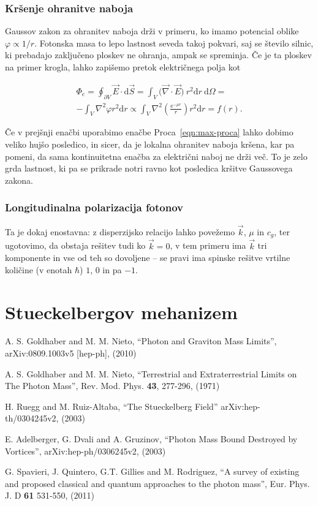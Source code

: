 \documentclass[a4paper, twocolumn, titlepage]{article}
\renewcommand{\div}{
	\ensuremath{\vec{\nabla}\cdot}
}
\newcommand{\ve}{
	\ensuremath{\vec{E}}
}
\renewcommand{\d}{
	\ensuremath{\mathrm{d}}
}
\begin{document}
\subsubsection{Kr\v senje ohranitve naboja}

Gaussov zakon za ohranitev naboja dr\v zi v primeru, ko imamo potencial oblike $\varphi \propto 1/r$. Fotonska masa to
lepo lastnost seveda takoj pokvari, saj se \v stevilo silnic, ki prebadajo zaklju\v ceno ploskev ne ohranja, ampak se
spreminja. \v Ce je ta ploskev na primer krogla, lahko zapi\v semo pretok elektri\v cnega polja kot

\begin{multline*}
	\Phi_e = \oint_{\partial V} \ve \cdot \d \vec{S} = \int_V \big(\div \ve\big)\ r^2\d r\ \d\Omega =\\
		- \int_V \nabla^2\varphi r^2 \d r \propto \int_V \nabla^2 \left(\frac{\text{e}^{-\mu r}}{r}\right)r^2 \d
		r = f(r).
\end{multline*}

\v Ce v prej\v snji ena\v cbi uporabimo ena\v cbe Proca~\eqref{eqn:max-proca} lahko dobimo veliko huj\v so posledico, in
sicer, da je lokalna ohranitev naboja kr\v sena, kar pa pomeni, da sama kontinuitetna ena\v cba za elektri\v cni naboj ne
dr\v zi ve\v c. To je zelo grda lastnost, ki pa se prikrade notri ravno kot posledica kr\v sitve Gaussovega zakona.

\subsubsection{Longitudinalna polarizacija fotonov}

Ta je dokaj enostavna: z disperzijsko relacijo lahko pove\v zemo $\vec{k}$, $\mu$ in $c_g$, ter ugotovimo, da obstaja
re\v sitev tudi ko $\vec{k} = 0$, v tem primeru ima $\vec{k}$ tri komponente in vse od teh so dovoljene -- se pravi ima
spinske re\v sitve vrtilne koli\v cine (v enotah $\hbar$) $1$, $0$ in pa $-1$.

\section{Stueckelbergov mehanizem}

\begin{thebibliography}{9}
	A. S. Goldhaber and M. M. Nieto,
	"`Photon and Graviton Mass Limits"',
	arXiv:0809.1003v5 [hep-ph],
	(2010)

	A. S. Goldhaber and M. M. Nieto,
	"`Terrestrial and Extraterrestrial Limits on The Photon Mass"',
	Rev. Mod. Phys. {\bf 43}, 277-296,
	(1971)

	H. Ruegg and M. Ruiz-Altaba,
	"`The Stueckelberg Field"'
	arXiv:hep-th/0304245v2,
	(2003)

	E. Adelberger, G. Dvali and A. Gruzinov,
	"`Photon Mass Bound Destroyed by Vortices"',
	arXiv:hep-ph/0306245v2,
	(2003)

	G. Spavieri, J. Quintero, G.T. Gillies and M. Rodriguez,
	"`A survey of existing and proposed classical and quantum approaches to the photon mass"',
	Eur. Phys. J. D {\bf 61} 531-550,
	(2011)
\end{thebibliography}
\end{document}
